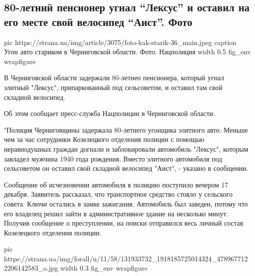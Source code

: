  
 
 
 
 
 
\subsection{80-летний пенсионер угнал \enquote{Лексус} и оставил на его месте свой велосипед \enquote{Аист}. Фото}
\label{sec:18_12_2020.news.ua.strana.1.pensioner_leksus}

\ifcmt
  pic https://strana.ua/img/article/3075/foto-kak-starik-36_main.jpeg
  caption Угон авто стариком в Черниговской области. Фото: Нацполиция 
  width 0.5
  fig_env wrapfigure
\fi

В Черниговской области задержали 80-летнео пенсионера, который угнал элитный
"Лексус", припаркованный под сельсоветом, и оставил там свой складной
велосипед. 

Об этом сообщает пресс-служба Нацполиции в Черниговской области.

"Полиция Черниговщины задержала 80-летнего угонщика элитного авто. Меньше чем
за час сотрудники Козелецкого отделения полиции с помощью неравнодушных граждан
догнали и заблокировали автомобиль "Лексус", которым завладел мужчина 1940 года
рождения. Вместо элитного автомобиля под сельсоветом он оставил свой складной
велосипед "Аист", - указано в сообщении. 

Сообщение об исчезновении автомобиля в полицию поступило вечером 17 декабря.
Заявитель рассказал, что транспортное средство стояло у сельского совета. Ключи
остались в замке зажигания. Автомобиль был заведен, потому что его владелец
решил зайти в административное здание на несколько минут. Получив сообщение о
преступлении, на поиски отправился весь личный состав Козелецкого отделения
полиции.

\ifcmt
  pic https://strana.ua/img/forall/u/11/58/131933732_1918185725014324_4789677122206142583_o.jpg
  width 0.3
  fig_env wrapfigure
\fi

